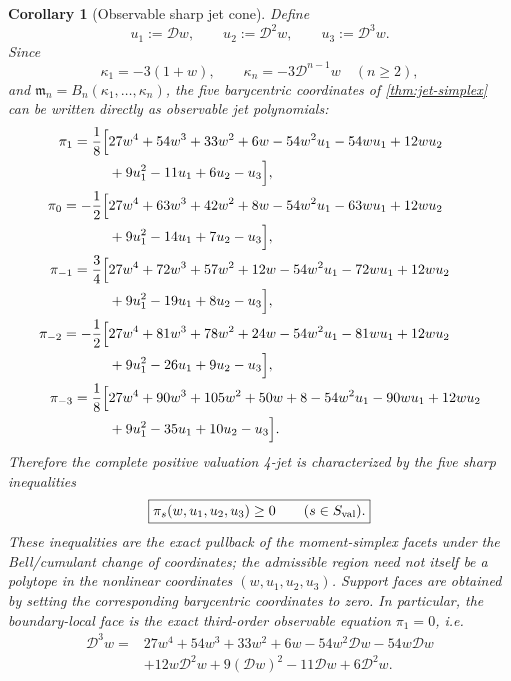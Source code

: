 \documentclass[aps,prd,reprint,onecolumn,nofootinbib,superscriptaddress,showkeys]{revtex4-2}
\numberwithin{equation}{section}
\theoremstyle{definition}
\theoremstyle{plain}
\newtheorem{corollary}{Corollary}[section]
\newcommand{\Dil}{\mathscr D}
\begin{document}
\begin{corollary}[Observable sharp jet cone]\label{cor:observable-jet-cone}
Define
\[
u_1:=\Dil w,\qquad u_2:=\Dil^2w,\qquad u_3:=\Dil^3w.
\]
Since
\[
\kappa_1=-3(1+w),
\qquad
\kappa_n=-3\Dil^{n-1}w\quad(n\ge2),
\]
and $\mathfrak m_n=B_n(\kappa_1,\ldots,\kappa_n)$, the five barycentric coordinates of \cref{thm:jet-simplex} can be written directly as observable jet polynomials:
\begin{align}
\pi_1=\frac18\Bigl[&27w^4+54w^3+33w^2+6w
-54w^2u_1-54wu_1+12wu_2\nonumber\\
&+9u_1^2-11u_1+6u_2-u_3\Bigr],\label{eq:pi1-wjet}\\
\pi_0=-\frac12\Bigl[&27w^4+63w^3+42w^2+8w
-54w^2u_1-63wu_1+12wu_2\nonumber\\
&+9u_1^2-14u_1+7u_2-u_3\Bigr],\\
\pi_{-1}=\frac34\Bigl[&27w^4+72w^3+57w^2+12w
-54w^2u_1-72wu_1+12wu_2\nonumber\\
&+9u_1^2-19u_1+8u_2-u_3\Bigr],\\
\pi_{-2}=-\frac12\Bigl[&27w^4+81w^3+78w^2+24w
-54w^2u_1-81wu_1+12wu_2\nonumber\\
&+9u_1^2-26u_1+9u_2-u_3\Bigr],\\
\pi_{-3}=\frac18\Bigl[&27w^4+90w^3+105w^2+50w+8
-54w^2u_1-90wu_1+12wu_2\nonumber\\
&+9u_1^2-35u_1+10u_2-u_3\Bigr].
\end{align}
Therefore the complete positive valuation 4-jet is characterized by the five sharp inequalities
\begin{equation}
\boxed{\pi_s(w,u_1,u_2,u_3)\ge0\qquad(s\in S_{\rm val}).}
\end{equation}
These inequalities are the exact pullback of the moment-simplex facets under the Bell/cumulant change of coordinates; the admissible region need not itself be a polytope in the nonlinear coordinates $(w,u_1,u_2,u_3)$.  Support faces are obtained by setting the corresponding barycentric coordinates to zero.  In particular, the boundary-local face is the exact third-order observable equation $\pi_1=0$, i.e.
\begin{equation}
\boxed{
\begin{aligned}
\Dil^3w={}&27w^4+54w^3+33w^2+6w
-54w^2\Dil w-54w\Dil w\\
&+12w\Dil^2w+9(\Dil w)^2-11\Dil w+6\Dil^2w.
\end{aligned}}
\label{eq:boundary-w-closure}
\end{equation}
\end{corollary}
\end{document}

